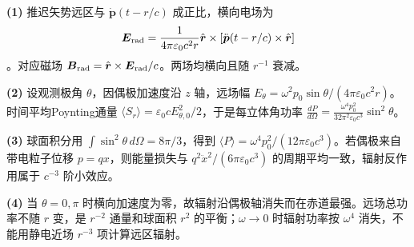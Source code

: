 \par\noindent\textbf{(1)} 推迟矢势远区与 \(\dot{\boldsymbol p}(t-r/c)\) 成正比，横向电场为 \[\boldsymbol E_{\rm rad}=\frac{1}{4\pi\varepsilon_0c^2r}\hat{\boldsymbol r}\times[\ddot{\boldsymbol p}(t-r/c)\times\hat{\boldsymbol r}]\]。对应磁场 \(\boldsymbol B_{\rm rad}=\hat{\boldsymbol r}\times\boldsymbol E_{\rm rad}/c\)。两场均横向且随 \(r^{-1}\) 衰减。
\par\noindent\textbf{(2)} 设观测极角 \(\theta\)，因偶极加速度沿 \(z\) 轴，远场幅 \(E_\theta=\omega^2p_0\sin\theta/(4\pi\varepsilon_0c^2r)\)。时间平均Poynting通量 \(\langle S_r\rangle=\varepsilon_0 cE_{\theta,0}^2/2\)，于是每立体角功率 \(\frac{dP}{d\Omega}=\frac{\omega^4p_0^2}{32\pi^2\varepsilon_0c^3}\sin^2\theta\)。
\par\noindent\textbf{(3)} 球面积分用 \(\int\sin^2\theta\,d\Omega=8\pi/3\)，得到 \(\langle P\rangle=\omega^4p_0^2/(12\pi\varepsilon_0c^3)\)。若偶极来自带电粒子位移 \(p=qx\)，则能量损失与 \(q^2\ddot x^2/(6\pi\varepsilon_0c^3)\) 的周期平均一致，辐射反作用属于 \(c^{-3}\) 阶小效应。
\par\noindent\textbf{(4)} 当 \(\theta=0,\pi\) 时横向加速度为零，故辐射沿偶极轴消失而在赤道最强。远场总功率不随 \(r\) 变，是 \(r^{-2}\) 通量和球面积 \(r^2\) 的平衡；\(\omega\to0\) 时辐射功率按 \(\omega^4\) 消失，不能用静电近场 \(r^{-3}\) 项计算远区辐射。
